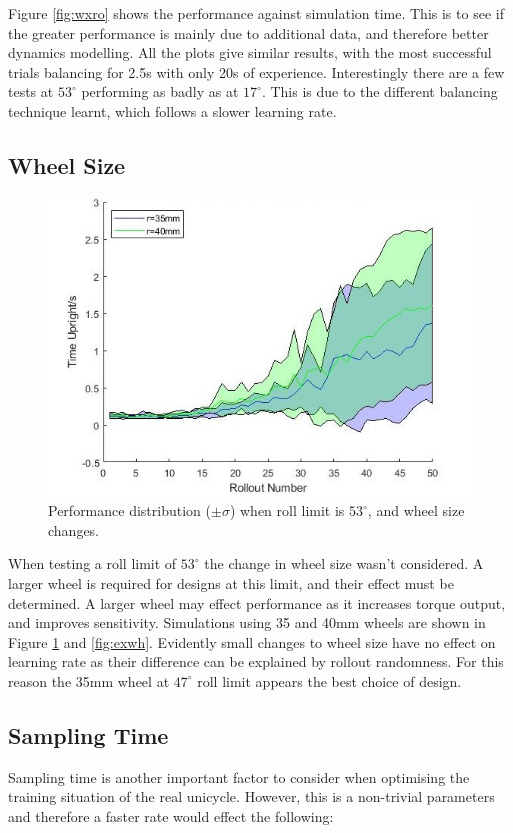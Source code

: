 \documentclass[twoside,twocolumn,12pt]{article}
\begin{document}
\newline
Figure \ref{fig:wxro} shows the performance against simulation time. This is to see if the greater performance is mainly due to additional data, and therefore better dynamics modelling. All the plots give similar results, with the most successful trials balancing for 2.5s with only 20s of experience. Interestingly there are a few tests at $53^{\circ}$ performing as badly as at $17^{\circ}$. This is due to the different balancing technique learnt, which follows a slower learning rate.
\subsection{Wheel Size}
\begin{figure}[h]
  \centering
    \includegraphics[width=\linewidth]{disp_wheel}
  \caption{Performance distribution ($\pm \sigma $) when roll limit is $53^{\circ}$, and wheel size changes. }
  \label{fig:whellsi}
\end{figure}
When testing a roll limit of $53^{\circ}$ the change in wheel size wasn't considered. A larger wheel is required for designs at this limit, and their effect must be determined. A larger wheel may effect performance as it increases torque output, and improves sensitivity. Simulations using 35 and 40mm wheels are shown in Figure \ref{fig:whellsi} and \ref{fig:exwh}. Evidently small changes to wheel size have no effect on learning rate as their difference can be explained by rollout randomness. For this reason the 35mm wheel at $47^{\circ}$  roll limit appears the best choice of design.
\subsection{Sampling Time}
Sampling time is another important factor to consider when optimising the training situation of the real unicycle. However, this is a non-trivial parameters and therefore a faster rate would effect the following:
\end{document}
